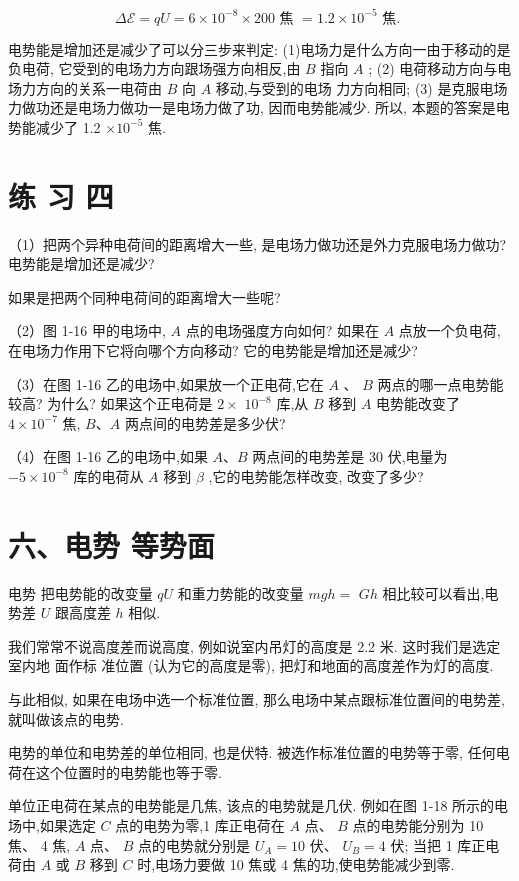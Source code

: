 \documentclass[10pt]{article}
\begin{document}
\[
\Delta \mathcal{E} = {qU} = 6 \times {10}^{-8} \times {200}\text{ 焦 } = {1.2} \times {10}^{-5}\text{ 焦. }
\]

电势能是增加还是减少了可以分三步来判定: (1)电场力是什么方向一由于移动的是负电荷, 它受到的电场力方向跟场强方向相反,由 \(B\) 指向 \(A\) ; (2) 电荷移动方向与电场力方向的关系一电荷由 \(B\) 向 \(A\) 移动,与受到的电场 力方向相同; (3) 是克服电场力做功还是电场力做功一是电场力做了功, 因而电势能减少. 所以, 本题的答案是电势能减少了 1.2 \(\times {10}^{-5}\) 焦.

\section*{练 习 四}

（1）把两个异种电荷间的距离增大一些, 是电场力做功还是外力克服电场力做功? 电势能是增加还是减少?

如果是把两个同种电荷间的距离增大一些呢?

（2）图 1-16 甲的电场中, \(A\) 点的电场强度方向如何? 如果在 \(A\) 点放一个负电荷,在电场力作用下它将向哪个方向移动? 它的电势能是增加还是减少?

（3）在图 1-16 乙的电场中,如果放一个正电荷,它在 \(A\) 、 \(B\) 两点的哪一点电势能较高? 为什么? 如果这个正电荷是 \(2 \times\) \({10}^{-8}\) 库,从 \(B\) 移到 \(A\) 电势能改变了 \(4 \times {10}^{-7}\) 焦, \(B\text{、}A\) 两点间的电势差是多少伏?

（4）在图 1-16 乙的电场中,如果 \(A\text{、}B\) 两点间的电势差是 30 伏,电量为 \(- 5 \times {10}^{-8}\) 库的电荷从 \(A\) 移到 \(\beta\) ,它的电势能怎样改变, 改变了多少?

\section*{六、电势 等势面}

电势 把电势能的改变量 \({qU}\) 和重力势能的改变量 \({mgh} =\) \({Gh}\) 相比较可以看出,电势差 \(U\) 跟高度差 \(h\) 相似.

我们常常不说高度差而说高度, 例如说室内吊灯的高度是 2.2 米. 这时我们是选定室内地 面作标 准位置 (认为它的高度是零), 把灯和地面的高度差作为灯的高度.

与此相似, 如果在电场中选一个标准位置, 那么电场中某点跟标准位置间的电势差, 就叫做该点的电势.

电势的单位和电势差的单位相同, 也是伏特. 被选作标准位置的电势等于零, 任何电荷在这个位置时的电势能也等于零.

单位正电荷在某点的电势能是几焦, 该点的电势就是几伏. 例如在图 1-18 所示的电场中,如果选定 \(C\) 点的电势为零,1 库正电荷在 \(A\) 点、 \(B\) 点的电势能分别为 10 焦、 4 焦, \(A\) 点、 \(B\) 点的电势就分别是 \({U}_{A} = {10}\) 伏、 \({U}_{B} = 4\) 伏; 当把 1 库正电荷由 \(A\) 或 \(B\) 移到 \(C\) 时,电场力要做 10 焦或 4 焦的功,使电势能减少到零.
\end{document}
